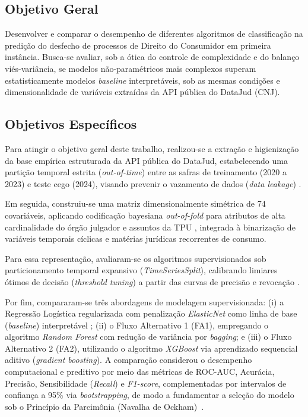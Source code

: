 \documentclass[conference]{IEEEtran}
\begin{document}
\subsection{Objetivo Geral}
Desenvolver e comparar o desempenho de diferentes algoritmos de classificação na predição do desfecho de processos de Direito do Consumidor em primeira instância. Busca-se avaliar, sob a ótica do controle de complexidade e do balanço viés-variância, se modelos não-paramétricos mais complexos superam estatisticamente modelos \textit{baseline} interpretáveis, sob as mesmas condições e dimensionalidade de variáveis extraídas da API pública do DataJud (CNJ).

\subsection{Objetivos Específicos}
Para atingir o objetivo geral deste trabalho, realizou-se a extração e higienização da base empírica estruturada da API pública do DataJud, estabelecendo uma partição temporal estrita (\textit{out-of-time}) entre as safras de treinamento (2020 a 2023) e teste cego (2024), visando prevenir o vazamento de dados (\textit{data leakage}) \cite{hyndman2021}.

Em seguida, construiu-se uma matriz dimensionalmente simétrica de 74 covariáveis, aplicando codificação bayesiana \textit{out-of-fold} para atributos de alta cardinalidade do órgão julgador e assuntos da TPU \cite{miccibarreca2001, izbicki2020}, integrada à binarização de variáveis temporais cíclicas e matérias jurídicas recorrentes de consumo.

Para essa representação, avaliaram-se os algoritmos supervisionados sob particionamento temporal expansivo (\textit{TimeSeriesSplit}), calibrando limiares ótimos de decisão (\textit{threshold tuning}) a partir das curvas de precisão e revocação \cite{izbicki2020}.

Por fim, compararam-se três abordagens de modelagem supervisionada: (i) a Regressão Logística regularizada com penalização \textit{ElasticNet} como linha de base (\textit{baseline}) interpretável \cite{zou2005, izbicki2020}; (ii) o Fluxo Alternativo 1 (FA1), empregando o algoritmo \textit{Random Forest} \cite{breiman2001} com redução de variância por \textit{bagging}; e (iii) o Fluxo Alternativo 2 (FA2), utilizando o algoritmo \textit{XGBoost} \cite{chen2016} via aprendizado sequencial aditivo (\textit{gradient boosting}). A comparação considerou o desempenho computacional e preditivo por meio das métricas de ROC-AUC, Acurácia, Precisão, Sensibilidade (\textit{Recall}) e \textit{F1-score}, complementadas por intervalos de confiança a 95\% via \textit{bootstrapping}, de modo a fundamentar a seleção do modelo sob o Princípio da Parcimônia (Navalha de Ockham)~\cite{izbicki2020}.
\end{document}
